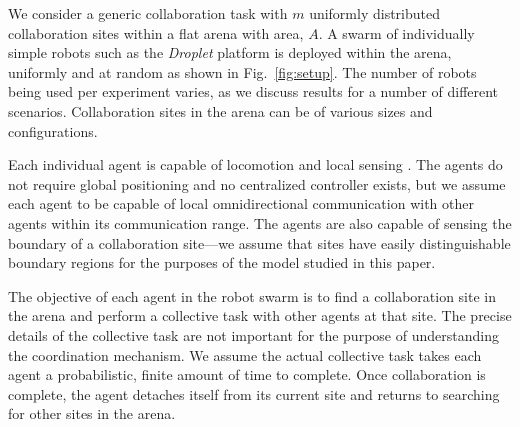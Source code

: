 \documentclass{TeXstyles/DARS/svmult}  %
\begin{document}
We consider a generic collaboration task with $m$ uniformly distributed collaboration sites within a flat arena with area, $A$. A swarm of individually simple robots such as the \emph{Droplet} platform \cite{farrow14,klingner14} is deployed within the arena, uniformly and at random as shown in Fig.~\ref{fig:setup}. The number of robots being used per experiment varies, as we discuss results for a number of different scenarios. Collaboration sites in the arena can be of various sizes and configurations.

Each individual agent is capable of locomotion \cite{klingner14} and local sensing \cite{farrow14}. The agents do not require global positioning and no centralized controller exists, but we assume each agent to be capable of local omnidirectional communication with other agents within its communication range. The agents are also capable of sensing the boundary of a collaboration site---we assume that sites have easily distinguishable boundary regions for the purposes of the model studied in this paper. 

The objective of each agent in the robot swarm is to find a collaboration site in the arena and perform a collective task with other agents at that site. The precise details of the collective task are not important for the purpose of understanding the coordination mechanism. We assume the actual collective task takes each agent a probabilistic, finite amount of time to complete. Once collaboration is complete, the agent detaches itself from its current site and returns to searching for other sites in the arena. 
\end{document}
